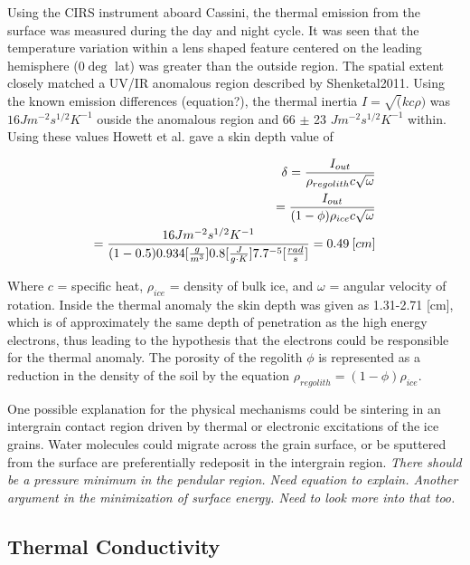 \documentclass[11pt]{article} %
\begin{document}
	Using the CIRS instrument aboard Cassini, the thermal emission from the surface was measured during the day and night cycle. It was seen that the temperature variation within a lens shaped feature centered on the leading hemisphere (0$\deg$ lat) was greater than the outside region. The spatial extent closely matched a UV/IR anomalous region described by Shenketal2011. Using the known emission differences (equation?), the thermal inertia $I=\sqrt(kc\rho)$ was $16 J m^{-2} s^{1/2} K^{-1}$ ouside the anomalous region and 66 $\pm$ 23 $J m^{-2} s^{1/2} K^{-1}$ within. Using these values Howett et al. gave a skin depth value of 
	
	\begin{equation}
	\begin{split}
	\delta = \frac{I_{out}}{\rho_{regolith} c \sqrt{\omega}}  \\
		= \frac{I_{out}}{(1-\phi)\rho_ {ice} c \sqrt{\omega}} \\
		= \frac{16  J m^{-2} s^{1/2} K^{-1}} {(1-0.5)0.934 [\frac{g}{m^{3}}] 0.8 [\frac{J}{g \cdot K}] 7.7\time10^{-5} [\frac{rad}{s}]} = 0.49\: [cm]
	\end{split}
	\end{equation}

	Where $c$ = specific heat, $\rho_{ice}$ = density of bulk ice, and $\omega$ = angular velocity of rotation. Inside the thermal anomaly the skin depth was given as 1.31-2.71 [cm], which is of approximately the same depth of penetration as the high energy electrons, thus leading to the hypothesis that the electrons could be responsible for the thermal anomaly. The porosity of the regolith $\phi$ is represented as a reduction in the density of the soil by the equation $\rho_{regolith} = (1-\phi)\rho_ {ice}$. 
	
	One possible explanation for the physical mechanisms could be sintering in an intergrain contact region driven by thermal or electronic excitations of the ice grains. Water molecules could migrate across the grain surface, or be sputtered from the surface are preferentially redeposit in the intergrain region. \emph{There should be a pressure minimum in the pendular region. Need equation to explain. Another argument in the minimization of surface energy. Need to look more into that too.}

\subsection{Thermal Conductivity}
\end{document}
